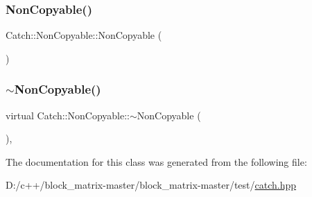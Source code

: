 \subsubsection{\texorpdfstring{Non\+Copyable()}{NonCopyable()}}
{\footnotesize\ttfamily Catch\+::\+Non\+Copyable\+::\+Non\+Copyable (\begin{DoxyParamCaption}{ }\end{DoxyParamCaption})\hspace{0.3cm}{\ttfamily [protected]}}

\mbox{\label{class_catch_1_1_non_copyable_a81254677280fef337eb4a676e91e3293}} 
\subsubsection{\texorpdfstring{$\sim$\+Non\+Copyable()}{~NonCopyable()}}
{\footnotesize\ttfamily virtual Catch\+::\+Non\+Copyable\+::$\sim$\+Non\+Copyable (\begin{DoxyParamCaption}{ }\end{DoxyParamCaption})\hspace{0.3cm}{\ttfamily [protected]}, {\ttfamily [virtual]}}



The documentation for this class was generated from the following file\+:\begin{DoxyCompactItemize}
\item 
D\+:/c++/block\+\_\+matrix-\/master/block\+\_\+matrix-\/master/test/\mbox{\hyperlink{catch_8hpp}{catch.\+hpp}}\end{DoxyCompactItemize}
